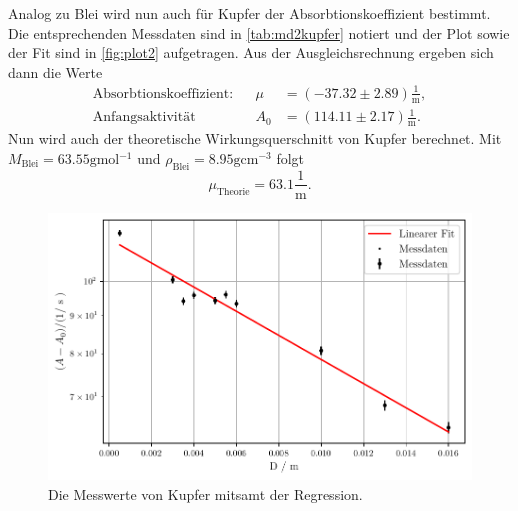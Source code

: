 Analog zu Blei wird nun auch für Kupfer der Absorbtionskoeffizient bestimmt.
Die entsprechenden Messdaten sind in \autoref{tab:md2kupfer} notiert und der Plot sowie der Fit sind in \autoref{fig:plot2} aufgetragen.
Aus der Ausgleichsrechnung ergeben sich dann die Werte
\begin{align*}
    \text{Absorbtionskoeffizient:} && \mu &= (-37.32 \pm 2.89) \frac{1}{\unit\meter},\\
    \text{Anfangsaktivität} && A_0 &= (114.11 \pm 2.17) \frac{1}{\unit\meter}.
\end{align*} 
Nun wird auch der theoretische Wirkungsquerschnitt von Kupfer berechnet.
Mit $M_\text{Blei} = 63.55 \unit{\gram\mol^{-1}}$ \cite{molaremasse} und $ \rho_\text{Blei} = 8.95 \unit{\gram\centi\meter^{-3}}$ folgt
\begin{equation}
    \mu_\text{Theorie} = 63.1 \frac{1}{\unit\meter}.
\end{equation}


\begin{figure}
    \centering
    \includegraphics[width=0.7 \linewidth]{build/plot2.pdf}
    \caption{Die Messwerte von Kupfer mitsamt der Regression.}
    \label{fig:plot2}
\end{figure}

